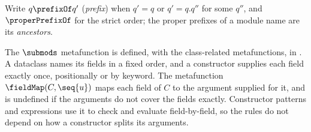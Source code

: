 Write $q \prefixOf q'$ (\emph{prefix}) when $q' = q$ or $q' = q.q''$ for some $q''$, and $\properPrefixOf$ for
the strict order; the proper prefixes of a module name are its \emph{ancestors}.
\begin{PaperOnly}
The $\submods$ metafunction is defined, with the class-related metafunctions, in .
A dataclass names its fields in a fixed order, and a constructor supplies each field exactly once,
positionally or by keyword. The metafunction $\fieldMap(C, \seq{u})$ maps each field of $C$ to the argument supplied for it,
and is undefined if the arguments do not cover the fields exactly. Constructor patterns and expressions
use it to check and evaluate field-by-field, so the rules do not depend on how a constructor splits its
arguments.


\end{PaperOnly}
